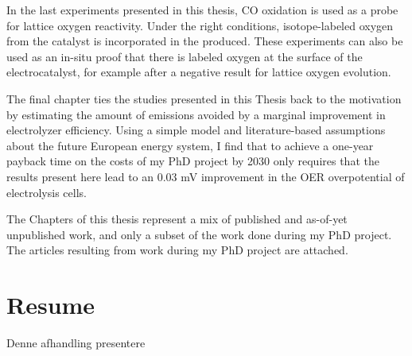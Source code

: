 \begin{adjustwidth}{1cm}{1cm}
In the last experiments presented in this thesis, CO oxidation is used as a probe for lattice oxygen reactivity. Under the right conditions, isotope-labeled oxygen from the catalyst is incorporated in the  produced. These experiments can also be used as an in-situ proof that there is labeled oxygen at the surface of the electrocatalyst, for example after a negative result for lattice oxygen evolution. 

The final chapter ties the studies presented in this Thesis back to the motivation by estimating the amount of  emissions avoided by a marginal improvement in electrolyzer efficiency. Using a simple model and literature-based assumptions about the future European energy system, I find that to achieve a one-year payback time on the  costs of my PhD project by 2030 only requires that the results present here lead to an 0.03 mV improvement in the OER overpotential of electrolysis cells. 

The Chapters of this thesis represent a mix of published and as-of-yet unpublished work, and only a subset of the work done during my PhD project. The articles resulting from work during my PhD project are attached.

\clearpage

\chapter*{Resume}
Denne afhandling presentere



\end{adjustwidth}